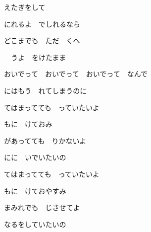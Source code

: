 \documentclass[a4paper,tate,twocolumn,12pt]{ltjtarticle}
\begin{document}
\begin{flushleft}
\begin{minipage}{\linewidth}
えたぎをして

にれるよ　でしれるなら

どこまでも　ただ　くへ
\end{minipage}

\vspace{2em}

\noindent\begin{minipage}{\linewidth}
　うよ　をけたまま

おいでって　おいでって　おいでって　なんで

にはもう　れてしまうのに
\end{minipage}

\vspace{3em}

\noindent\begin{minipage}{\linewidth}
てはまってても　っていたいよ

もに　けておみ

があってても　りかないよ

にに　いでいたいの
\end{minipage}

\vspace{2em}

\noindent\begin{minipage}{\linewidth}
てはまってても　っていたいよ

もに　けておやすみ

まみれでも　じさせてよ

なるをしていたいの
\end{minipage}

\end{flushleft}
\end{document}
